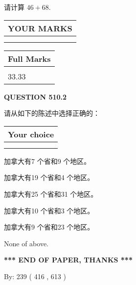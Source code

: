 \documentclass{ctexart}
\begin{document}
  
 
请计算 $ %
46 +  %
68 $.
 

 

 
  
\vspace{0.2in}
  
\noindent\begin{tabular}{|l|}
\hline
 YOUR MARKS  \\
\hline
 \\ 
 \\ 
\hline
\end{tabular}
\hspace{0.05in} \begin{tabular}{|l|}
\hline
 Full Marks  \\
\hline
 \\ 
33.33 \\
\hline
\end{tabular}
{\textbf{\Large{QUESTION
510.2 
}}}
  
  
请从如下的陈述中选择正确的：
  
  
\noindent\hspace{3.0in} \begin{tabular}{|l|}
\hline
Your choice \\
\hline
 \\ 
 \\ 
\hline
\end{tabular}
  
  
 
 
加拿大有7 个省和9 个地区。
 
 
加拿大有19 个省和4 个地区。
 
 
加拿大有25 个省和31 个地区。
 
 
加拿大有10 个省和3 个地区。
 
 
加拿大有9 个省和23 个地区。
 
 
 None of above.
 
 
   
   
 \vspace{0.2in}
 
   
   
   
   
\vspace{1.0in} 
{\textbf{\large{ *** END OF PAPER, THANKS *** }}} 
   
   
\hspace{1.0in} By: 
 239 ( 416 ,  613 )
   
\end{document}
